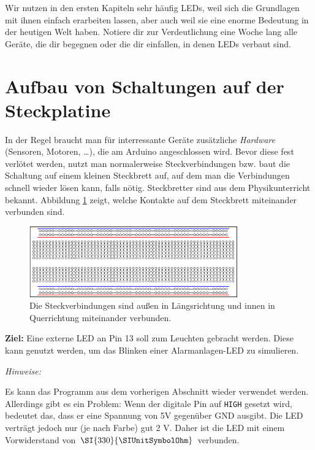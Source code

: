 \begin{aufgabe}
	Wir nutzen in den ersten Kapiteln sehr häufig LEDs, weil sich die Grundlagen mit ihnen einfach erarbeiten lassen, aber auch weil sie eine enorme Bedeutung in der heutigen Welt haben. Notiere dir zur Verdeutlichung eine Woche lang alle Geräte, die dir begegnen oder die dir einfallen, in denen LEDs verbaut sind.
\end{aufgabe}


\newpage
\section{Aufbau von Schaltungen auf der Steckplatine}

In der Regel braucht man für interressante Geräte zusätzliche \emph{Hardware} (Sensoren, Motoren, \dots), die am Arduino angeschlossen wird. Bevor diese fest verlötet werden, nutzt man normalerweise Steckverbindungen bzw. baut die Schaltung auf einem kleinen Steckbrett auf, auf dem man die Verbindungen schnell wieder lösen kann, falls nötig. Steckbretter sind aus dem Physikunterricht bekannt. Abbildung \ref{abb:steckbrett} zeigt, welche Kontakte auf dem Steckbrett miteinander verbunden sind.

\begin{figure}[h]
	\centering
	\includegraphics[width=0.8\textwidth]{./Zeichnungen/steckbrett.png}
	\caption{Die Steckverbindungen sind außen in Längsrichtung und innen in Querrichtung miteinander verbunden.}
	\label{abb:steckbrett}
\end{figure}

\begin{ziel}
	\textbf{Ziel:} Eine externe LED an Pin 13 soll zum Leuchten gebracht werden. Diese kann genutzt werden, um das Blinken einer Alarmanlagen-LED zu simulieren.
\end{ziel}

\emph{Hinweise:} 

Es kann das Programm aus dem vorherigen Abschnitt wieder verwendet werden. Allerdings gibt es ein Problem: Wenn der digitale Pin auf \texttt{HIGH} gesetzt wird, bedeutet das, dass er eine Spannung von 5V gegenüber GND ausgibt. Die LED verträgt jedoch nur (je nach Farbe) gut 2 V. Daher ist die LED mit einem Vorwiderstand von $\SI{330}{\SIUnitSymbolOhm}$ verbunden.

